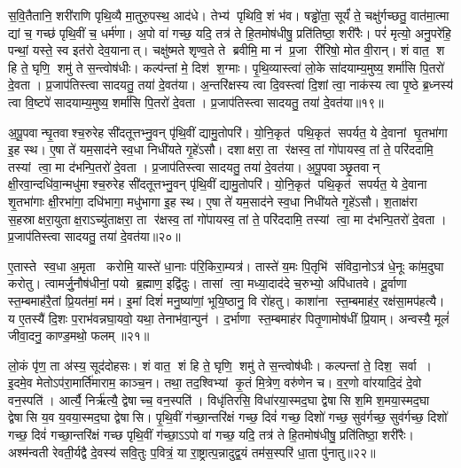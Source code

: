 स॒वि॒तैतानि॒ शरी॑राणि पृथि॒व्यै मा॒तुरु॒पस्थ॒ आद॑धे। तेभ्य॑ पृथिवि॒ शं भ॑व। षड्ढो॑ता॒ सूर्यं॑ ते॒ चक्षु॑र्गच्छतु॒ वात॑मा॒त्मा द्यां च॒ गच्छ॑ पृथि॒वीं च॒ धर्म॑णा। अ॒पो वा॑ गच्छ॒ यदि॒ तत्र॑ ते हि॒तमोष॑धीषु॒ प्रति॑तिष्ठा॒ शरी॑रैः। परं॑ मृत्यो॒ अनु॒परे॑हि॒ पन्थां॒ यस्ते॒ स्व इत॑रो देव॒यानात्। चक्षु॑ष्मते शृण्व॒ते ते ब्रवीमि॒ मा न॑ प्र॒जा री॑रिषो॒ मोत वी॒रान्। शं वात॒ श हि ते॒ घृणि॒ शमु॑ ते स॒न्त्वोष॑धीः। कल्प॑न्तां मे॒ दिश॑ श॒ग्माः। पृ॒थि॒व्यास्त्वा॑ लो॒के सा॑दयाम्य॒मुष्य॒ शर्मा॑सि पि॒तरो॑ दे॒वता। प्र॒जाप॑तिस्त्वा सादयतु॒ तया॑ दे॒वत॑या। अ॒न्तरि॑क्षस्य त्वा दि॒वस्त्वा॑ दि॒शां त्वा॒ नाक॑स्य त्वा पृ॒ष्ठे ब्र॒ध्नस्य॑ त्वा वि॒ष्टपे॑ सादयाम्य॒मुष्य॒ शर्मा॑सि पि॒तरो॑ दे॒वता। प्र॒जाप॑तिस्त्वा सादयतु॒ तया॑ दे॒वत॑या॥१९॥

अ॒पू॒पवान्घृ॒तवाश्च॒रुरेह सी॑दतूत्तभ्नु॒वन् पृ॑थि॒वीं द्यामु॒तोपरि॑। यो॒नि॒कृत॑ पथि॒कृत॑ सपर्यत॒ ये दे॒वानां घृ॒तभा॑गा इ॒ह स्थ। ए॒षा ते॑ यम॒साद॑ने स्व॒धा निधी॑यते गृ॒हे॑ऽसौ। दशाक्षरा॒ ता र॑क्षस्व॒ तां गो॑पायस्व॒ तां ते॒ परि॑ददामि॒ तस्यां त्वा॒ मा द॑भन्पि॒तरो॑ दे॒वता। प्र॒जाप॑तिस्त्वा सादयतु॒ तया॑ दे॒वत॑या। अ॒पू॒पवाञ्छृ॒तवान् क्षी॒रवा॒न्दधि॑वा॒न्मधु॑माश्च॒रुरेह सी॑दतूत्तभ्नु॒वन् पृ॑थि॒वीं द्यामु॒तोपरि॑। यो॒नि॒कृत॑ पथि॒कृत॑ सपर्यत॒ ये दे॒वाना शृ॒तभा॑गाः क्षी॒रभा॑गा॒ दधि॑भागा॒ मधु॑भागा इ॒ह स्थ। ए॒षा ते॑ यम॒साद॑ने स्व॒धा निधी॑यते गृ॒हे॑ऽसौ। श॒ताक्ष॑रा स॒हस्राक्षरा॒युताक्ष॒राऽच्यु॑ताक्षरा॒ ता र॑क्षस्व॒ तां गो॑पायस्व॒ तां ते॒ परि॑ददामि॒ तस्यां त्वा॒ मा द॑भन्पि॒तरो॑ दे॒वता। प्र॒जाप॑तिस्त्वा सादयतु॒ तया॑ दे॒वत॑या॥२०॥
\anuvakamend[अन॑पस्फुरन्ती॒रुत्त॑र दे॒वत॑या॒ द्वे च॑]

ए॒तास्ते स्व॒धा अ॒मृता करोमि॒ यास्ते॑ धा॒नाः प॑रि॒किरा॒म्यत्र॑। तास्ते॑ य॒मः पि॒तृभि॑ संविदा॒नोऽत्र॑ धे॒नूः का॑म॒दुघा करोतु। त्वामर्जु॒नौष॑धीनां॒ पयो ब्र॒ह्माण॒ इद्वि॑दुः। तासां त्वा॒ मध्या॒दाद॑दे च॒रुभ्यो॒ अपि॑धातवे। दू॒र्वाणा स्त॒म्बमाह॑रै॒तां प्रि॒यत॑मां॒ मम॑। इ॒मां दिशं॑ मनु॒ष्या॑णां॒ भूयि॒ष्ठानु॒ वि रो॑हतु। काशा॑ना स्त॒म्बमाह॑र॒ रक्ष॑सा॒मप॑हत्यै। य ए॒तस्यै॑ दि॒शः प॒राभ॑वन्नघा॒यवो॒ यथा॒ तेनाभ॑वा॒न्पुन॑। द॒र्भाणा स्त॒म्बमाह॑र पितृ॒णामोष॑धीं प्रि॒याम्। अन्वस्यै॒ मूलं॑ जीवा॒दनु॒ काण्ड॒मथो॒ फलम्॥२१॥

लो॒कं पृ॑ण॒ ता अ॑स्य॒ सूद॑दोहसः। शं वात॒ शं हि ते॒ घृणि॒ शमु॑ ते स॒न्त्वोष॑धीः। कल्पन्तां ते॒ दिश॒ सर्वा। इ॒दमे॒व मेतोऽप॑रा॒मार्ति॑माराम॒ काञ्च॒न। तथा॒ तद॒श्विभ्यां कृ॒तं मि॒त्रेण॒ वरु॑णेन च। व॒र॒णो वा॑रयादि॒दं दे॒वो वन॒स्पति॑। आर्त्यै॒ निर्\mbox{}ऋ॑त्यै॒ द्वेषाच्च॒ वन॒स्पति॑। विधृ॑तिरसि॒ विधा॑रया॒स्मद॒घा द्वेषासि श॒मि श॒मया॒स्मद॒घा द्वेषासि य॒व य॒वया॒स्मद॒घा द्वेषासि। पृ॒थि॒वीं ग॑च्छा॒न्तरि॑क्षं गच्छ॒ दिवं॑ गच्छ॒ दिशो॑ गच्छ॒ सुव॑र्गच्छ॒ सुव॑र्गच्छ॒ दिशो॑ गच्छ॒ दिवं॑ गच्छा॒न्तरि॑क्षं गच्छ पृथि॒वीं ग॑च्छा॒ऽऽपो वा॑ गच्छ॒ यदि॒ तत्र॑ ते हि॒तमोष॑धीषु॒ प्रति॑तिष्ठा॒ शरी॑रैः। अश्म॑न्वती रेवती॒र्यद्वै दे॒वस्य॑ सवि॒तुः प॒वित्रं॒ या रा॒ष्ट्रात्प॒न्नादुद्व॒यं तम॑स॒स्परि॑ धा॒ता पु॑नातु॥२२॥
\anuvakamend[फलं॑ पुनातु]

